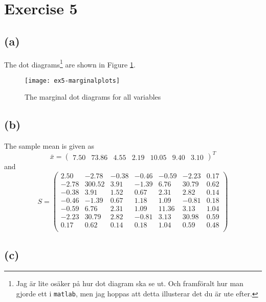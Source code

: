 
\section*{Exercise 5}
\label{sec:exercise5}

\subsection*{(a)}
\label{sec:a-4}

The dot diagrams\footnote{Jag är lite osäker på hur dot diagram ska se
  ut. Och framföralt hur man gjorde ett i \texttt{matlab}, men jag
  hoppas att detta illusterar det du är ute efter.} are shown in Figure \ref{fig:ex5-marginalplots}. 

\begin{figure}[h]
  \centering
  \texttt{[image: ex5-marginalplots]}
  \caption{The marginal dot diagrams for all variables}
  \label{fig:ex5-marginalplots}
\end{figure}

\subsection*{(b)}
\label{sec:b-4}

The sample mean is given as
\begin{equation*}
  \bar{x} =
  \begin{pmatrix}
    7.50 & 73.86 & 4.55 & 2.19 & 10.05 & 9.40 & 3.10 
  \end{pmatrix}^T
\end{equation*}
and
\begin{equation*}
  S =
  \begin{pmatrix}
    2.50 & -2.78 & -0.38 & -0.46 & -0.59 & -2.23 & 0.17 \\ 
    -2.78 & 300.52 & 3.91 & -1.39 & 6.76 & 30.79 & 0.62 \\ 
    -0.38 & 3.91 & 1.52 & 0.67 & 2.31 & 2.82 & 0.14 \\ 
    -0.46 & -1.39 & 0.67 & 1.18 & 1.09 & -0.81 & 0.18 \\ 
    -0.59 & 6.76 & 2.31 & 1.09 & 11.36 & 3.13 & 1.04 \\ 
    -2.23 & 30.79 & 2.82 & -0.81 & 3.13 & 30.98 & 0.59 \\ 
    0.17 & 0.62 & 0.14 & 0.18 & 1.04 & 0.59 & 0.48 \\ 
  \end{pmatrix}
\end{equation*}

\subsection*{(c)}
\label{sec:c-4}

